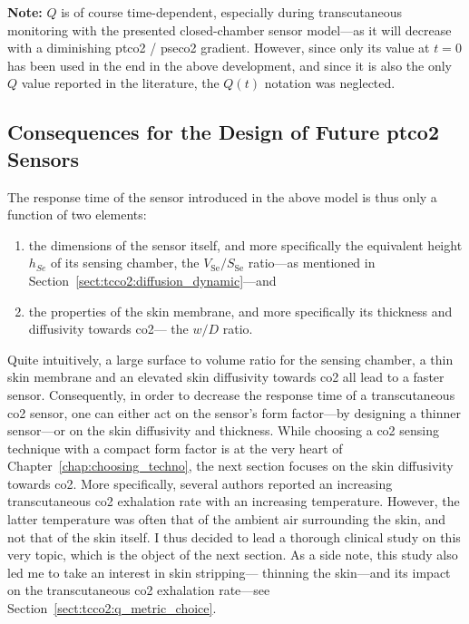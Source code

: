 \textbf{Note:} $Q$ is of course time-dependent, especially during transcutaneous monitoring with the presented closed-chamber sensor model---as it will decrease with a diminishing \gls{ptco2} / \gls{pseco2} gradient. However, since only its value at $t=0$ has been used in the end in the above development, and since it is also the only $Q$ value reported in the literature, the $Q(t)$ notation was neglected.

\subsection{Consequences for the Design of Future \texorpdfstring{\gls{ptco2}}{tcpCO2} Sensors}

The response time of the sensor introduced in the above model is thus only a function of two elements:
\begin{enumerate}
	\item the dimensions of the sensor itself, and more specifically the equivalent height $h_{Se}$ of its sensing chamber, \ie{} the $V_\text{Se}/S_\text{Se}$ ratio---as mentioned in Section~\ref{sect:tcco2:diffusion_dynamic}---and
	\item the properties of the skin membrane, and more specifically its thickness and diffusivity towards \gls{co2}---\ie{} the $w/D$ ratio.
\end{enumerate}

Quite intuitively, a large surface to volume ratio for the sensing chamber, a thin skin membrane and an elevated skin diffusivity towards \gls{co2} all lead to a faster sensor. Consequently, in order to decrease the response time of a transcutaneous \gls{co2} sensor, one can either act on the sensor's form factor---by designing a thinner sensor---or on the skin diffusivity and thickness. While choosing a \gls{co2} sensing technique with a compact form factor is at the very heart of Chapter~\ref{chap:choosing_techno}, the next section focuses on the skin diffusivity towards \gls{co2}. More specifically, several authors reported an increasing transcutaneous \gls{co2} exhalation rate with an increasing temperature\cite{shaw1929, shaw1930, whitehouse1932}. However, the latter temperature was often that of the ambient air surrounding the skin, and not that of the skin itself. I thus decided to lead a thorough clinical study on this very topic, which is the object of the next section. As a side note, this study also led me to take an interest in skin stripping---\ie{} thinning the skin---and its impact on the transcutaneous \gls{co2} exhalation rate---see Section~\ref{sect:tcco2:q_metric_choice}.

